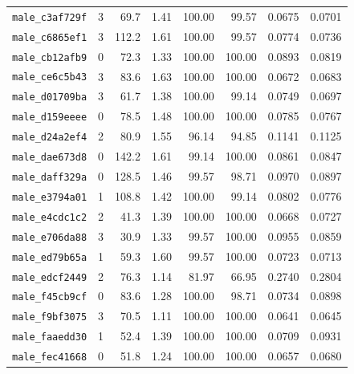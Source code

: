 \begin{longtable}{lrrrrrrr}
\texttt{male\_c3af729f} & 3 & 69.7 & 1.41 & 100.00 & 99.57 & 0.0675 & 0.0701 \\
\texttt{male\_c6865ef1} & 3 & 112.2 & 1.61 & 100.00 & 99.57 & 0.0774 & 0.0736 \\
\texttt{male\_cb12afb9} & 0 & 72.3 & 1.33 & 100.00 & 100.00 & 0.0893 & 0.0819 \\
\texttt{male\_ce6c5b43} & 3 & 83.6 & 1.63 & 100.00 & 100.00 & 0.0672 & 0.0683 \\
\texttt{male\_d01709ba} & 3 & 61.7 & 1.38 & 100.00 & 99.14 & 0.0749 & 0.0697 \\
\texttt{male\_d159eeee} & 0 & 78.5 & 1.48 & 100.00 & 100.00 & 0.0785 & 0.0767 \\
\texttt{male\_d24a2ef4} & 2 & 80.9 & 1.55 & 96.14 & 94.85 & 0.1141 & 0.1125 \\
\texttt{male\_dae673d8} & 0 & 142.2 & 1.61 & 99.14 & 100.00 & 0.0861 & 0.0847 \\
\texttt{male\_daff329a} & 0 & 128.5 & 1.46 & 99.57 & 98.71 & 0.0970 & 0.0897 \\
\texttt{male\_e3794a01} & 1 & 108.8 & 1.42 & 100.00 & 99.14 & 0.0802 & 0.0776 \\
\texttt{male\_e4cdc1c2} & 2 & 41.3 & 1.39 & 100.00 & 100.00 & 0.0668 & 0.0727 \\
\texttt{male\_e706da88} & 3 & 30.9 & 1.33 & 99.57 & 100.00 & 0.0955 & 0.0859 \\
\texttt{male\_ed79b65a} & 1 & 59.3 & 1.60 & 99.57 & 100.00 & 0.0723 & 0.0713 \\
\texttt{male\_edcf2449} & 2 & 76.3 & 1.14 & 81.97 & 66.95 & 0.2740 & 0.2804 \\
\texttt{male\_f45cb9cf} & 0 & 83.6 & 1.28 & 100.00 & 98.71 & 0.0734 & 0.0898 \\
\texttt{male\_f9bf3075} & 3 & 70.5 & 1.11 & 100.00 & 100.00 & 0.0641 & 0.0645 \\
\texttt{male\_faaedd30} & 1 & 52.4 & 1.39 & 100.00 & 100.00 & 0.0709 & 0.0931 \\
\texttt{male\_fec41668} & 0 & 51.8 & 1.24 & 100.00 & 100.00 & 0.0657 & 0.0680 \\
\end{longtable}\endgroup
